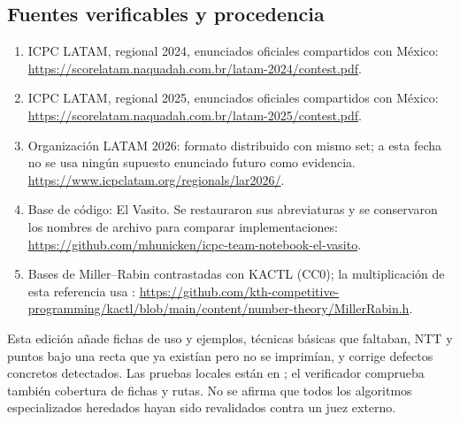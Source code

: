 \subsection{Fuentes verificables y procedencia}
{\small
\begin{enumerate}
\item ICPC LATAM, regional 2024, enunciados oficiales compartidos con México:
\url{https://scorelatam.naquadah.com.br/latam-2024/contest.pdf}.
\item ICPC LATAM, regional 2025, enunciados oficiales compartidos con México:
\url{https://scorelatam.naquadah.com.br/latam-2025/contest.pdf}.
\item Organización LATAM 2026: formato distribuido con mismo set; a esta fecha no se usa ningún supuesto enunciado futuro como evidencia.
\url{https://www.icpclatam.org/regionals/lar2026/}.
\item Base de código: El Vasito. Se restauraron sus abreviaturas y se conservaron los nombres de archivo para comparar implementaciones:
\url{https://github.com/mhunicken/icpc-team-notebook-el-vasito}.
\item Bases de Miller--Rabin contrastadas con KACTL (CC0); la multiplicación de esta referencia usa :
\url{https://github.com/kth-competitive-programming/kactl/blob/main/content/number-theory/MillerRabin.h}.
\end{enumerate}}
Esta edición añade fichas de uso y ejemplos, técnicas básicas que faltaban, NTT y puntos bajo una recta que ya existían pero no se imprimían, y corrige defectos concretos detectados. Las pruebas locales están en ; el verificador comprueba también cobertura de fichas y rutas. No se afirma que todos los algoritmos especializados heredados hayan sido revalidados contra un juez externo.
